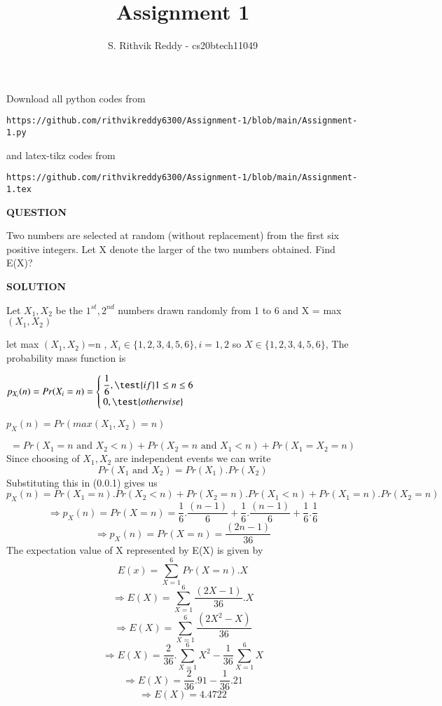 \documentclass[journal,12pt,twocolumn]{IEEEtran}
\begin{document}
     \def\rightbox#1{\makebox[0in][r]{#1}}
     \def\centbox#1{\makebox[0in]{#1}}
     \def\topbox#1{\raisebox{-\baselineskip}[0in][0in]{#1}}
     \def\midbox#1{\raisebox{-0.5\baselineskip}[0in][0in]{#1}}
\vspace{3cm}
\title{Assignment 1}
\author{S. Rithvik Reddy - cs20btech11049}
\maketitle
\newpage
\bigskip
\renewcommand{\thefigure}{\theenumi}
\renewcommand{\thetable}{\theenumi}
Download all python codes from 
\begin{lstlisting}
https://github.com/rithvikreddy6300/Assignment-1/blob/main/Assignment-1.py
\end{lstlisting}
%
and latex-tikz codes from 
%
\begin{lstlisting}
https://github.com/rithvikreddy6300/Assignment-1/blob/main/Assignment-1.tex
\end{lstlisting}
\vspace{0.5cm}
\textbf{QUESTION}
\vspace{0.5cm}

Two numbers are selected at random (without replacement) from the first six positive integers. Let X denote the larger of the two numbers obtained. Find E(X)?

\vspace{0.5cm}
\textbf{SOLUTION}
\vspace{0.5cm}

Let $X_1,X_2$ be the $1^{st},2^{nd}$ numbers drawn randomly from 1 to 6 and X = max $(X_1,X_2)$

let max $(X_1,X_2)$=n , $X_i\in \{ 1,2,3,4,5,6 \}, i=1,2$ so $X \in \{ 1,2,3,4,5,6 \}$, The probability mass function is 

\vspace{0.5cm}
$p_{X_i}(n)= Pr(X_i=n)= \begin{cases}
\dfrac{1}{6},  \test{  if } 1 \leq n \leq 6\\
0,  \test{  otherwise }
\end{cases}$

 $p_X(n) =Pr(max (X_1,X_2)=n)$
 
\begin{equation} \label{eu_eqn}
    = Pr(X_1=n\text{ and }X_2<n)+Pr(X_2=n\text{ and }X_1<n)+Pr(X_1=X_2=n)
\end{equation}
 Since choosing of $X_1,X_2$ are independent events we can write 
 $$Pr(X_1 \text{ and }X_2)=Pr(X_1).Pr(X_2)$$
 Substituting this in (0.0.1) gives us
 $$p_X(n)=Pr(X_1=n).Pr(X_2<n)+Pr(X_2=n).Pr(X_1<n)+Pr(X_1=n).Pr(X_2=n)$$
$$\Longrightarrow p_X(n)=Pr(X=n)=\dfrac{1}{6}.\dfrac{(n-1)}{6}+\dfrac{1}{6}.\dfrac{(n-1)}{6}+\dfrac{1}{6}.\dfrac{1}{6}$$
$$\Longrightarrow p_X(n)=Pr(X=n)=\dfrac{(2n-1)}{36}$$
The expectation value of X represented by E(X) is given by
$$E(x)=\sum_{X=1}^{6} Pr(X=n).X$$
$$\Longrightarrow E(X)=\sum_{X=1}^{6} \dfrac{(2X-1)}{36}.X$$
$$\Longrightarrow E(X)=\sum_{X=1}^{6} \dfrac{(2X^2-X)}{36}$$
$$\Longrightarrow E(X)=\dfrac{2}{36}.\sum_{X=1}^{6} X^2-\dfrac{1}{36}\sum_{X=1}^{6} X$$
$$\Longrightarrow E(X)=\dfrac{2}{36}.91-\dfrac{1}{36}.21$$
$$\Longrightarrow E(X)= 4.4722$$
\end{document}
